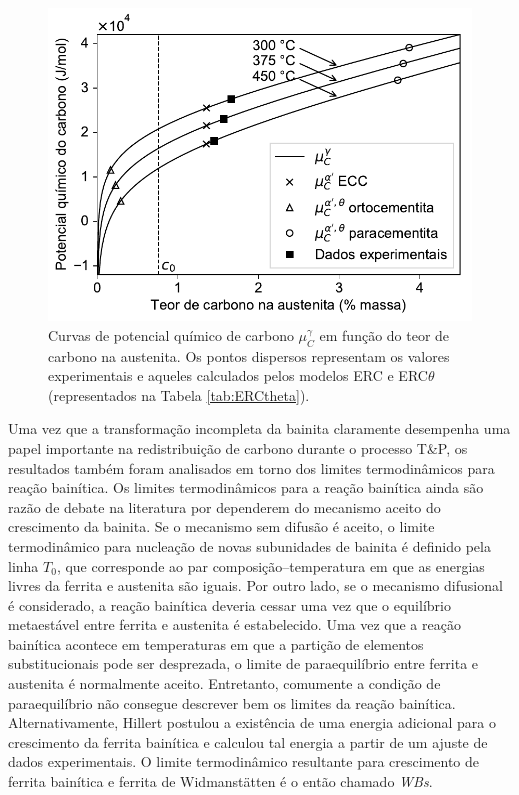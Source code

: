 \begin{figure}
  \centering  
  \includegraphics[width=.8\textwidth]{img/thermo-calc/CCE.pdf}
  \caption{Curvas de potencial químico de carbono $\mu_C^\gamma$ em função do teor de carbono na austenita. Os pontos dispersos representam os valores experimentais e aqueles calculados pelos modelos ERC e ERC$\theta$ (representados na Tabela \ref{tab:ERCtheta}).}
  \label{fig:ERC_chempot}
\end{figure}

Uma vez que a transformação incompleta da bainita claramente desempenha uma papel importante na redistribuição de carbono durante o processo T\&P, os resultados também foram analisados em torno dos limites termodinâmicos para reação bainítica. Os limites termodinâmicos para a reação bainítica ainda são razão de debate na literatura por dependerem do mecanismo aceito do crescimento da bainita. Se o mecanismo sem difusão é aceito, o limite termodinâmico para nucleação de novas subunidades de bainita é definido pela linha $T_0$, que corresponde ao par composição--temperatura em que as energias livres da ferrita e austenita são iguais. 
Por outro lado, se o mecanismo difusional é considerado, a reação bainítica deveria cessar uma vez que o equilíbrio metaestável entre ferrita e austenita é estabelecido. Uma vez que a reação bainítica acontece em temperaturas em que a partição de elementos substitucionais pode ser desprezada, o limite de paraequilíbrio entre ferrita e austenita é normalmente aceito. Entretanto, comumente a condição de paraequilíbrio não consegue descrever bem os limites da reação bainítica. Alternativamente, Hillert postulou a existência de uma energia adicional para o crescimento da ferrita bainítica e calculou tal energia a partir de um ajuste de dados experimentais. O limite termodinâmico resultante para crescimento de ferrita bainítica e ferrita de Widmanstätten é o então chamado \textit{WBs}. 

